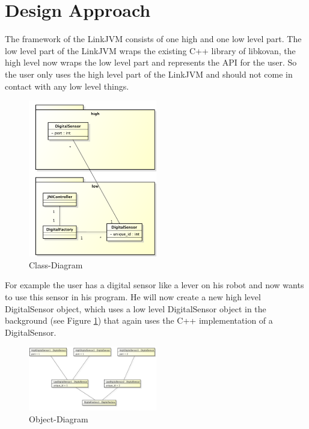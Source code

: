 \documentclass{juniorjournal}
\begin{document}
\section{Design Approach}
\label{sec:design-approach}
The framework of the LinkJVM consists of one high and one low level part.
The low level part of the LinkJVM wraps the existing C++ library of libkovan\cite{libkovan}, 
the high level now wraps the low level part and represents the API for the user.
So the user only uses the high level part of the LinkJVM and should not come in 
contact with any low level things.

\begin{figure}[H]
\centering
\includegraphics[width=0.5\textwidth]{images/Class-Diagram.pdf}
\caption{Class-Diagram}
\label{fig:Class-Diagram}
\end{figure}

For example the user has a digital sensor like a lever on his robot and now 
wants to use this sensor in his program. He will now create a new high level 
DigitalSensor object, which uses a low level DigitalSensor object in the 
background (see Figure \ref{fig:Class-Diagram}) that again uses the C++ implementation of a DigitalSensor.

\begin{figure}[H]
\centering
\includegraphics[width=0.5\textwidth]{images/Object-Diagram.pdf}
\caption{Object-Diagram}
\label{fig:Object-Diagram}
\end{figure}
\end{document}
